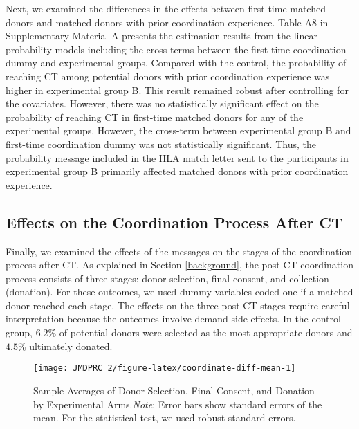 \documentclass[12pt, a4paper]{article}
\begin{document}
Next, we examined the differences in the effects between first-time matched donors and matched donors with prior coordination experience. Table A8 in Supplementary Material A presents the estimation results from the linear probability models including the cross-terms between the first-time coordination dummy and experimental groups. Compared with the control, the probability of reaching CT among potential donors with prior coordination experience was higher in experimental group B. This result remained robust after controlling for the covariates. However, there was no statistically significant effect on the probability of reaching CT in first-time matched donors for any of the experimental groups. However, the cross-term between experimental group B and first-time coordination dummy was not statistically significant. Thus, the probability message included in the HLA match letter sent to the participants in experimental group B primarily affected matched donors with prior coordination experience.

\hypertarget{process}{%
\subsection{Effects on the Coordination Process After CT}\label{process}}

Finally, we examined the effects of the messages on the stages of the coordination process after CT. As explained in Section \ref{background}, the post-CT coordination process consists of three stages: donor selection, final consent, and collection (donation). For these outcomes, we used dummy variables coded one if a matched donor reached each stage. The effects on the three post-CT stages require careful interpretation because the outcomes involve demand-side effects. In the control group, \(6.2\)\% of potential donors were selected as the most appropriate donors and \(4.5\)\% ultimately donated.

\begin{figure}[t]
\texttt{[image: JMDPRC~2/figure-latex/coordinate-diff-mean-1]} \caption{Sample Averages of Donor Selection, Final Consent, and Donation by Experimental Arms.\newline \emph{Note}: Error bars show standard errors of the mean. For the statistical test, we used robust standard errors.}\label{fig:coordinate-diff-mean}
\end{figure}
\end{document}
